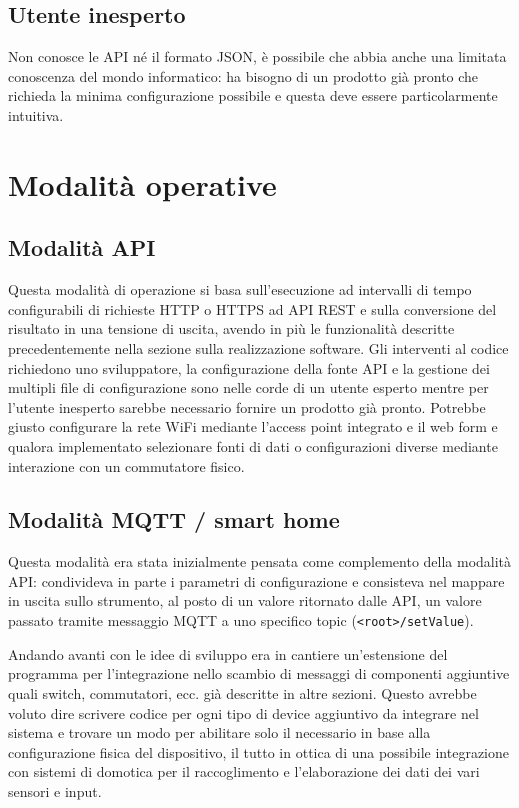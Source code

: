 \documentclass[12pt,a4paper]{report}
\begin{document}
\subsection*{Utente inesperto}
Non conosce le API né il formato JSON, è possibile che abbia anche una limitata conoscenza del mondo informatico:
ha bisogno di un prodotto già pronto che richieda la minima configurazione possibile e questa
deve essere particolarmente intuitiva. 


\section{Modalità operative}

\subsection{Modalità API}
Questa modalità di operazione si basa sull'esecuzione ad intervalli di tempo configurabili di richieste HTTP o HTTPS ad API REST
e sulla conversione del risultato in una tensione di uscita, avendo in più le funzionalità descritte precedentemente nella sezione
sulla realizzazione software.
Gli interventi al codice richiedono uno sviluppatore, la configurazione della fonte API e la gestione dei multipli file di configurazione sono nelle
corde di un utente esperto mentre per l'utente inesperto sarebbe necessario fornire un prodotto già pronto. Potrebbe giusto configurare
la rete WiFi mediante l'access point integrato e il web form e qualora implementato selezionare fonti di dati o configurazioni diverse mediante
interazione con un commutatore fisico.

\subsection{Modalità MQTT / smart home}
Questa modalità era stata inizialmente pensata come complemento della modalità API: condivideva in parte i parametri di configurazione
e consisteva nel mappare in uscita sullo strumento, al posto di un valore ritornato dalle API, un valore passato tramite messaggio MQTT
a uno specifico topic (\texttt{<root>/setValue}).

Andando avanti con le idee di sviluppo era in cantiere un'estensione del programma per l'integrazione nello scambio di messaggi di componenti
aggiuntive quali switch, commutatori, ecc. già descritte in altre sezioni. Questo avrebbe voluto dire scrivere codice per ogni tipo di device
aggiuntivo da integrare nel sistema e trovare un modo per abilitare solo il necessario in base alla configurazione fisica del dispositivo,
il tutto in ottica di una possibile integrazione con sistemi di domotica per il raccoglimento e l'elaborazione dei dati dei vari sensori e input.
\end{document}
